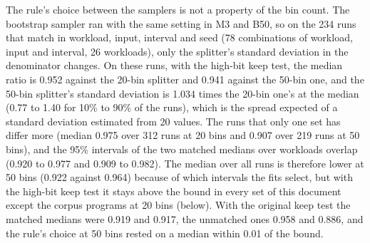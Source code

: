 \documentclass[11pt]{article}
\begin{document}
The rule's choice between the samplers is not a property of the bin count. The bootstrap sampler ran with the same
setting in M3 and B50, so on the 234 runs that match in workload, input, interval and seed (78 combinations of
workload, input and interval, 26 workloads), only the splitter's standard deviation in the denominator changes. On
these runs, with the high-bit keep test, the median ratio is 0.952 against the 20-bin splitter and 0.941 against the
50-bin one, and the 50-bin splitter's standard deviation is 1.034 times the 20-bin one's at the median (0.77 to 1.40
for 10\% to 90\% of the runs), which is the spread expected of a standard deviation estimated from 20 values. The runs
that only one set has differ more (median 0.975 over 312 runs at 20 bins and 0.907 over 219 runs at 50 bins), and the
95\% intervals of the two matched medians over workloads overlap (0.920 to 0.977 and 0.909 to 0.982). The median over
all runs is therefore lower at 50 bins (0.922 against 0.964) because of which intervals the fits select, but with the
high-bit keep test it stays above the bound in every set of this document except the corpus programs at 20 bins
(below). With the original keep test the matched medians were 0.919 and 0.917, the unmatched ones 0.958 and 0.886, and
the rule's choice at 50 bins rested on a median within 0.01 of the bound.
\end{document}
